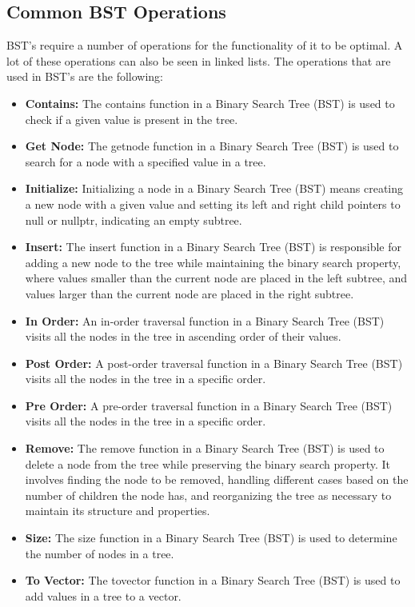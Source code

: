 \subsection*{Common BST Operations}

BST's require a number of operations for the functionality of it to be optimal. A lot of these operations can also be seen in linked lists. The operations that are used in BST's are the following:

\begin{itemize}
    \item \textbf{Contains:} The contains function in a Binary Search Tree (BST) is used to check if a given value is present in the tree.
    \item \textbf{Get Node:} The getnode function in a Binary Search Tree (BST) is used to search for a node with a specified value in a tree.
    \item \textbf{Initialize:} Initializing a node in a Binary Search Tree (BST) means creating a new node with a given value and setting its left and right child pointers to null or nullptr, indicating an empty subtree.
    \item \textbf{Insert:} The insert function in a Binary Search Tree (BST) is responsible for adding a new node to the tree while maintaining the binary search property, where values smaller than the current node are 
    placed in the left subtree, and values larger than the current node are placed in the right subtree.
    \item \textbf{In Order:} An in-order traversal function in a Binary Search Tree (BST) visits all the nodes in the tree in ascending order of their values.
    \item \textbf{Post Order:} A post-order traversal function in a Binary Search Tree (BST) visits all the nodes in the tree in a specific order.
    \item \textbf{Pre Order:} A pre-order traversal function in a Binary Search Tree (BST) visits all the nodes in the tree in a specific order.
    \item \textbf{Remove:} The remove function in a Binary Search Tree (BST) is used to delete a node from the tree while preserving the binary search property. It involves finding the node to be removed, handling different 
    cases based on the number of children the node has, and reorganizing the tree as necessary to maintain its structure and properties.
    \item \textbf{Size:} The size function in a Binary Search Tree (BST) is used to determine the number of nodes in a tree.
    \item \textbf{To Vector:} The tovector function in a Binary Search Tree (BST) is used to add values in a tree to a vector.
\end{itemize}

